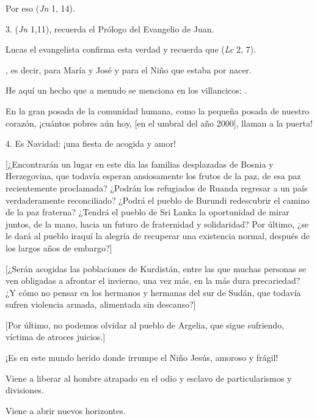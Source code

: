 \begin{body}
							Por eso  (\emph{Jn} 1, 14).
							
							3.  (\emph{Jn} 1,11), recuerda el Prólogo del Evangelio de Juan.
							
							Lucas el evangelista confirma esta verdad y recuerda que  (\emph{Lc} 2, 7).
							
							, es decir, para María y José y para el Niño que estaba por nacer.
							
							He aquí un hecho que a menudo se menciona en los villancicos: .
							
							En la gran posada de la comunidad humana, como la pequeña posada de nuestro corazón, ¡cuántos pobres aún hoy, {[}en el umbral del año 2000{]}, llaman a la puerta!
							
							4. Es Navidad: ¡una fiesta de acogida y amor!
							
							{[}¿Encontrarán un lugar en este día las familias desplazadas de Bosnia y Herzegovina, que todavía esperan ansiosamente los frutos de la paz, de esa paz recientemente proclamada? ¿Podrán los refugiados de Ruanda regresar a un país verdaderamente reconciliado? ¿Podrá el pueblo de Burundi redescubrir el camino de la paz fraterna? ¿Tendrá el pueblo de Sri Lanka la oportunidad de mirar juntos, de la mano, hacia un futuro de fraternidad y solidaridad? Por último, ¿se le dará al pueblo iraquí la alegría de recuperar una existencia normal, después de los largos años de embargo?{]}
							
							{[}¿Serán acogidas las poblaciones de Kurdistán, entre las que muchas personas se ven obligadas a afrontar el invierno, una vez más, en la más dura precariedad? ¿Y cómo no pensar en los hermanos y hermanas del sur de Sudán, que todavía sufren violencia armada, alimentada sin descanso?{]}
							
							{[}Por último, no podemos olvidar al pueblo de Argelia, que sigue sufriendo, víctima de atroces juicios.{]}
							
							¡Es en este mundo herido donde irrumpe el Niño Jesús, amoroso y frágil!
							
							Viene a liberar al hombre atrapado en el odio y esclavo de particularismos y divisiones.
							
							Viene a abrir nuevos horizontes.
							

\end{body}
